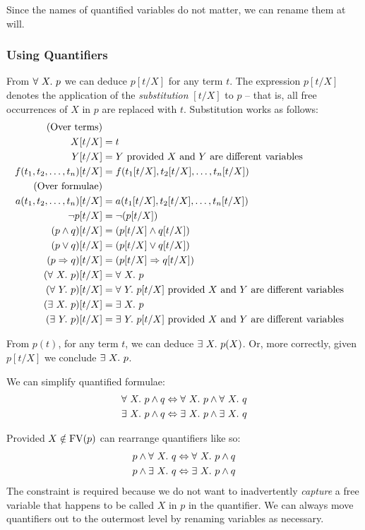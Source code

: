 Since the names of quantified variables do not matter, we can rename
them at will.

\subsubsection{Using Quantifiers}

From $\forall\ X.\ p$ we can deduce $p[t/X]$ for any term $t$.  The
expression $p[t/X]$ denotes the application of the \emph{substitution}
$[t/X]$ to $p$ -- that is, all free occurrences of $X$ in $p$ are
replaced with $t$.  Substitution works as follows:
\begin{align*}
\text{(Over terms)} \\
X[t/X]
& = t \\
Y[t/X]
& = Y \text{ provided $X$ and $Y$ are different variables} \\
f(t_1, t_2, \ldots, t_n)[t/X]
& = f(t_1[t/X], t_2[t/X], \ldots, t_n[t/X]) \\
\text{(Over formulae)} \\
a(t_1, t_2, \ldots, t_n)[t/X]
& = a(t_1[t/X], t_2[t/X], \ldots, t_n[t/X]) \\
\neg{}p[t/X]
& = \neg{}(p[t/X]) \\
(p \wedge q)[t/X]
& = (p[t/X] \wedge q[t/X]) \\
(p \vee q)[t/X]
& = (p[t/X] \vee q[t/X]) \\
(p \Rightarrow q)[t/X]
& = (p[t/X] \Rightarrow q[t/X]) \\
(\forall\ X.\ p)[t/X]
& = \forall\ X.\ p \\
(\forall\ Y.\ p)[t/X]
& = \forall\ Y.\ p[t/X] \text{ provided $X$ and $Y$ are different variables} \\
(\exists\ X.\ p)[t/X]
& = \exists\ X.\ p \\
(\exists\ Y.\ p)[t/X]
& = \exists\ Y.\ p[t/X] \text{ provided $X$ and $Y$ are different variables} \\
\end{align*}

From $p(t)$, for any term $t$, we can deduce $\exists\ X.\ p(X)$.  Or, more
correctly, given $p[t/X]$ we conclude $\exists\ X.\ p$.

We can simplify quantified formulae:
\begin{align*}
\forall\ X.\ p \wedge q
& \Leftrightarrow \forall\ X.\ p \wedge \forall\ X.\ q\\
\exists\ X.\ p \wedge q
& \Leftrightarrow \exists\ X.\ p \wedge \exists\ X.\ q
\end{align*}

Provided $X \notin \text{FV}(p)$ can rearrange quantifiers like so:
\begin{align*}
p \wedge \forall\ X.\ q
& \Leftrightarrow \forall\ X.\ p \wedge q \\
p \wedge \exists\ X.\ q
& \Leftrightarrow \exists\ X.\ p \wedge q \\
\end{align*}
The constraint is required because we do not want to inadvertently
\emph{capture} a free variable that happens to be called $X$ in $p$ in
the quantifier.  We can always move quantifiers out to the outermost
level by renaming variables as necessary.

